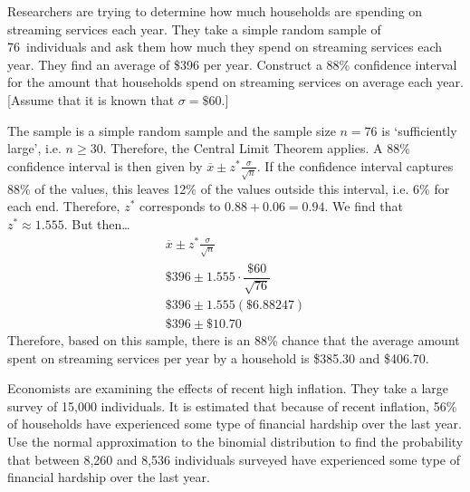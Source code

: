 \documentclass[11pt,letterpaper]{article}
\begin{document}

 Researchers are trying to determine how much households are spending on streaming services each year. They take a simple random sample of 76~individuals and ask them how much they spend on streaming services each year. They find an average of \$396 per year. Construct a 88\% confidence interval for the amount that households spend on streaming services on average each year. [Assume that it is known that $\sigma= \$60$.] \pspace

\sol The sample is a simple random sample and the sample size $n= 76$ is `sufficiently large', i.e. $n \geq 30$. Therefore, the Central Limit Theorem applies. A 88\% confidence interval is then given by $\overline{x} \pm z^* \frac{\sigma}{\sqrt{n}}$. If the confidence interval captures 88\% of the values, this leaves 12\% of the values outside this interval, i.e. 6\% for each end. Therefore, $z^*$ corresponds to $0.88 + 0.06= 0.94$. We find that $z^* \approx 1.555$. But then\dots
	\[
	\begin{gathered}
	\overline{x} \pm z^* \frac{\sigma}{\sqrt{n}} \\[0.3cm]
	\$396 \pm 1.555 \cdot \dfrac{\$60}{\sqrt{76}} \\[0.3cm]
	\$396 \pm 1.555(\$6.88247) \\[0.3cm]
	\$396 \pm \$10.70
	\end{gathered}
	\] \pspace
Therefore, based on this sample, there is an 88\% chance that the average amount spent on streaming services per year by a household is \$385.30 and \$406.70. 



\newpage



 Economists are examining the effects of recent high inflation. They take a large survey of 15,000 individuals. It is estimated that because of recent inflation, 56\% of households have experienced some type of financial hardship over the last year. Use the normal approximation to the binomial distribution to find the probability that between 8,260 and 8,536 individuals surveyed have experienced some type of financial hardship over the last year. \pspace
\end{document}
